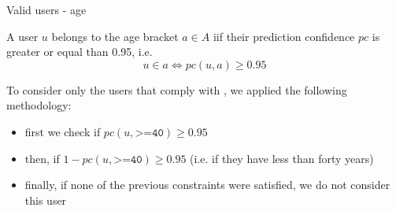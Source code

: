 \documentclass[9pt,aspectratio=1610]{beamer}  %
\begin{document}
\begin{frame}{Valid users - age}

    \begin{definition}[4]
    \label{def:valid-users-age}
    	A user \(u\) belongs to the age bracket \(a \in A\) iif their prediction confidence \(pc\) is greater or equal than 0.95, i.e.
    	\[u \in a \Longleftrightarrow pc(u, a) \geq 0.95\]
    \end{definition}
    
    To consider only the users that comply with , we applied the following methodology:
    
    \begin{itemize}
    	\item first we check if \(pc(u, \texttt{>=40}) \geq 0.95\)
    	\item then, if \(1 - pc(u, \texttt{>=40}) \geq 0.95\) (i.e. if they have less than forty years)
    	\item finally, if none of the previous constraints were satisfied, we do not consider this user
    \end{itemize}
    
\end{frame}
\end{document}
